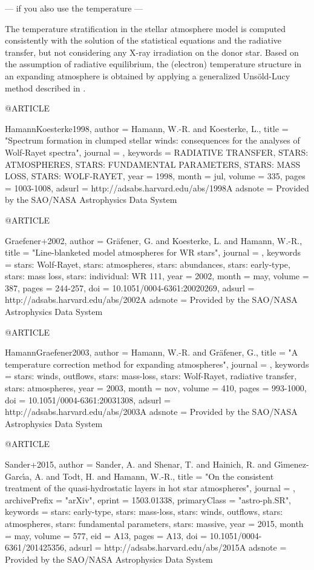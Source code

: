--- if you also use the temperature ---

The temperature stratification in the stellar atmosphere model is computed consistently with the solution of the statistical equations and the radiative transfer, but not considering any X-ray irradiation on the donor star. Based on the assumption of radiative equilibrium, the (electron) temperature structure in an expanding atmosphere is obtained by applying a generalized Uns{\"o}ld-Lucy method described in \citet{HamannGraefener2003}.


@ARTICLE{HamannKoesterke1998,
   author = {{Hamann}, W.-R. and {Koesterke}, L.},
    title = "{Spectrum formation in clumped stellar winds: consequences for the analyses of Wolf-Rayet spectra}",
  journal = {\aap},
 keywords = {RADIATIVE TRANSFER, STARS: ATMOSPHERES, STARS: FUNDAMENTAL PARAMETERS, STARS: MASS LOSS, STARS: WOLF-RAYET},
     year = 1998,
    month = jul,
   volume = 335,
    pages = {1003-1008},
   adsurl = {http://adsabs.harvard.edu/abs/1998A%
  adsnote = {Provided by the SAO/NASA Astrophysics Data System}
}

@ARTICLE{Graefener+2002,
   author = {{Gr{\"a}fener}, G. and {Koesterke}, L. and {Hamann}, W.-R.},
    title = "{Line-blanketed model atmospheres for WR stars}",
  journal = {\aap},
 keywords = {stars: Wolf-Rayet, stars: atmospheres, stars: abundances, stars: early-type, stars: mass loss, stars: individual: WR 111},
     year = 2002,
    month = may,
   volume = 387,
    pages = {244-257},
      doi = {10.1051/0004-6361:20020269},
   adsurl = {http://adsabs.harvard.edu/abs/2002A%
  adsnote = {Provided by the SAO/NASA Astrophysics Data System}
}

@ARTICLE{HamannGraefener2003,
   author = {{Hamann}, W.-R. and {Gr{\"a}fener}, G.},
    title = "{A temperature correction method for expanding atmospheres}",
  journal = {\aap},
 keywords = {stars: winds, outflows, stars: mass-loss, stars: Wolf-Rayet, radiative transfer, stars: atmospheres},
     year = 2003,
    month = nov,
   volume = 410,
    pages = {993-1000},
      doi = {10.1051/0004-6361:20031308},
   adsurl = {http://adsabs.harvard.edu/abs/2003A%
  adsnote = {Provided by the SAO/NASA Astrophysics Data System}
}

@ARTICLE{Sander+2015,
   author = {{Sander}, A. and {Shenar}, T. and {Hainich}, R. and {G{\'{\i}}menez-Garc{\'{\i}}a}, A. and 
    {Todt}, H. and {Hamann}, W.-R.},
    title = "{On the consistent treatment of the quasi-hydrostatic layers in hot star atmospheres}",
  journal = {\aap},
archivePrefix = "arXiv",
   eprint = {1503.01338},
 primaryClass = "astro-ph.SR",
 keywords = {stars: early-type, stars: mass-loss, stars: winds, outflows, stars: atmospheres, stars: fundamental parameters, stars: massive},
     year = 2015,
    month = may,
   volume = 577,
      eid = {A13},
    pages = {A13},
      doi = {10.1051/0004-6361/201425356},
   adsurl = {http://adsabs.harvard.edu/abs/2015A%
  adsnote = {Provided by the SAO/NASA Astrophysics Data System}
}

}}}}
